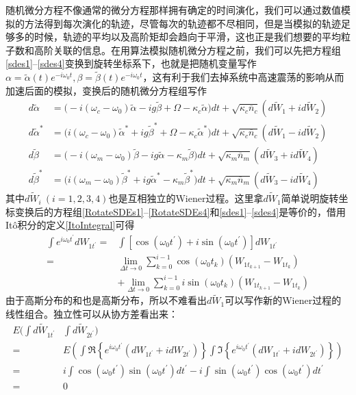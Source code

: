 随机微分方程不像通常的微分方程那样拥有确定的时间演化，我们可以通过数值模拟的方法得到每次演化的轨迹，尽管每次的轨迹都不尽相同，但是当模拟的轨迹足够多的时候，轨迹的平均以及高阶矩却会趋向于平滑，这也正是我们想要的平均粒子数和高阶关联的信息。在用算法模拟随机微分方程之前，我们可以先把方程组\eqref{sdes1}--\eqref{sdes4}变换到旋转坐标系下，也就是把随机变量写作$\alpha=\tilde{\alpha}(t) e^{-i\omega_{0}t}, \beta=\tilde{\beta}(t) e^{-i\omega_{0}t}$，这有利于我们去掉系统中高速震荡的影响从而加速后面的模拟，变换后的随机微分方程组写作
\begin{align}
d{\tilde{\alpha}}&=\big(-i(\omega_{c}-\omega_{0})\tilde{\alpha}-ig\tilde{\beta}+\Omega -\kappa_{c}\tilde{\alpha}\big)dt+\sqrt{\kappa_c\overline{n}_{c}}(d\tilde{W}_1+id\tilde{W}_2) \label{RotateSDEs1} \\
d{\tilde{\alpha}^{*}}&=\big(i(\omega_{c}-\omega_{0})\tilde{\alpha}^{*}+ig\tilde{\beta}^{*}+\Omega -\kappa_{c}\tilde{\alpha}^{*}\big)dt+\sqrt{\kappa_c\overline{n}_{c}}(d\tilde{W}_1-id\tilde{W}_2) \\
d{\tilde{\beta}}&=\big(-i(\omega_{m}-\omega_{0})\tilde{\beta}-ig\tilde{\alpha}-\kappa_{m}\tilde{\beta}\big)dt+\sqrt{\kappa_m\overline{n}_{m}}(d\tilde{W}_3+id\tilde{W}_4) \\
d{\tilde{\beta}^{*}}&=\big(i(\omega_{m}-\omega_{0})\tilde{\beta}^{*}+ig\tilde{\alpha}^{*}-\kappa_{m}\tilde{\beta}^{*}\big)dt+\sqrt{\kappa_m\overline{n}_{m}}(d\tilde{W}_3-id\tilde{W}_4) \label{RotateSDEs4}
\end{align}
其中$d\tilde{W}_i~(i=1,2,3,4)$也是互相独立的Wiener过程。这里拿$d\tilde{W}_1$简单说明旋转坐标变换后的方程组\eqref{RotateSDEs1}--\eqref{RotateSDEs4}和\eqref{sdes1}--\eqref{sdes4}是等价的，借用It\^o积分的定义\eqref{ItoIntegral}可得
\begin{equation}
\begin{aligned}
\int e^{i\omega_{0}t^{\prime}} d W_{1t^{\prime}} ={}& \int \left[\cos({\omega_{0}t^{\prime}})+i\sin({\omega_{0}t^{\prime}})\right] d W_{1t^{\prime}} \\
={}& \lim\limits_{\Delta t \to 0} \sum_{k=0}^{i-1} \cos({\omega_{0}t_k})\left(W_{1t_{k+1}}-W_{1t_{k}}\right) \\
&+ \lim\limits_{\Delta t \to 0} \sum_{k=0}^{i-1} i\sin({\omega_{0}t_k})\left(W_{1t_{k+1}}-W_{1t_{k}}\right)
\end{aligned}
\end{equation}
由于高斯分布的和也是高斯分布，所以不难看出$d\tilde{W}_1$可以写作新的Wiener过程的线性组合。独立性可以从协方差看出来：
\begin{equation}
\begin{aligned}
E\bigg(\int d \tilde{W}_{1t^{\prime}} &\int d \tilde{W}_{2t^{\prime}}\bigg) \\
={}&E\left(\int \Re\left\{e^{i\omega_{0}t^{\prime}} (d{W}_{1t^{\prime}}+id{W}_{2t^{\prime}})\right\} \int \Im\left\{e^{i\omega_{0}t^{\prime}}(d{W}_{1t^{\prime}}+id{W}_{2t^{\prime}})\right\}\right) \\
={}& i\int \cos({\omega_{0}t^{\prime}})\sin({\omega_{0}t^{\prime}}) d{t^{\prime}} - i\int \sin({\omega_{0}t^{\prime}})\cos({\omega_{0}t^{\prime}}) d{t^{\prime}} \\
={}&0
\end{aligned}
\end{equation}
